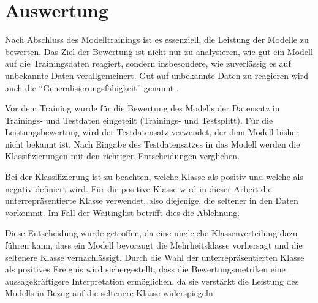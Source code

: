 \chapter{Auswertung}
\label{ref:auswertung}
Nach Abschluss des Modelltrainings ist es essenziell, die Leistung der Modelle zu bewerten.
Das Ziel der Bewertung ist nicht nur zu analysieren, wie gut ein Modell auf die Trainingsdaten reagiert, sondern insbesondere, wie zuverlässig es auf unbekannte Daten verallgemeinert.
Gut auf unbekannte Daten zu reagieren wird auch die \enquote{Generalisierungsfähigkeit} genannt \cite{Goodfellow2016}.


Vor dem Training wurde für die Bewertung des Modells der Datensatz in Trainings- und Testdaten eingeteilt (Trainings- und Testsplitt).
Für die Leistungsbewertung wird der Testdatensatz verwendet, der dem Modell bisher nicht bekannt ist.
Nach Eingabe des Testdatensatzes in das Modell werden die Klassifizierungen mit den richtigen Entscheidungen verglichen.

Bei der Klassifizierung ist zu beachten, welche Klasse als positiv und welche als negativ definiert wird.  
Für die positive Klasse wird in dieser Arbeit die unterrepräsentierte Klasse verwendet, also diejenige, die seltener in den Daten vorkommt.  
Im Fall der Waitinglist betrifft dies die Ablehnung.  

Diese Entscheidung wurde getroffen, da eine ungleiche Klassenverteilung dazu führen kann, dass ein Modell bevorzugt die Mehrheitsklasse vorhersagt und die seltenere Klasse vernachlässigt.  
Durch die Wahl der unterrepräsentierten Klasse als positives Ereignis wird sichergestellt, dass die Bewertungsmetriken eine aussagekräftigere Interpretation ermöglichen, da sie verstärkt die Leistung des Modells in Bezug auf die seltenere Klasse widerspiegeln.





